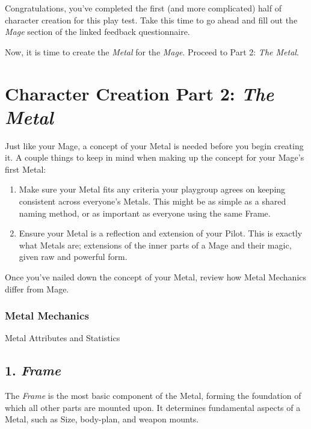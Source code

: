 \documentclass[
]{article}
\providecommand{\tightlist}{%
  \setlength{\itemsep}{0pt}\setlength{\parskip}{0pt}}
\begin{document}
Congratulations, you've completed the first (and more complicated) half
of character creation for this play test. Take this time to go ahead and
fill out the \emph{Mage} section of the linked feedback questionnaire.

Now, it is time to create the \emph{Metal} for the \emph{Mage}. Proceed
to Part 2: \emph{The Metal}.

\hypertarget{character-creation-part-2-the-metal}{%
\section{\texorpdfstring{Character Creation Part 2: \emph{The
Metal}}{Character Creation Part 2: The Metal}}\label{character-creation-part-2-the-metal}}

Just like your Mage, a concept of your Metal is needed before you begin
creating it. A couple things to keep in mind when making up the concept
for your Mage's first Metal:

\begin{enumerate}
\tightlist
\item
  Make sure your Metal fits any criteria your playgroup agrees on
  keeping consistent across everyone's Metals. This might be as simple
  as a shared naming method, or as important as everyone using the same
  Frame.
\item
  Ensure your Metal is a reflection and extension of your Pilot. This is
  exactly what Metals are; extensions of the inner parts of a Mage and
  their magic, given raw and powerful form.
\end{enumerate}

Once you've nailed down the concept of your Metal, review how Metal
Mechanics differ from Mage.

\hypertarget{metal-mechanics}{%
\subsubsection{Metal Mechanics}\label{metal-mechanics}}

{Metal Attributes and Statistics}

\hypertarget{frame}{%
\subsection{\texorpdfstring{1. \emph{Frame}}{1. Frame}}\label{frame}}

The \emph{Frame} is the most basic component of the Metal, forming the
foundation of which all other parts are mounted upon. It determines
fundamental aspects of a Metal, such as Size, body-plan, and weapon
mounts.
\end{document}
